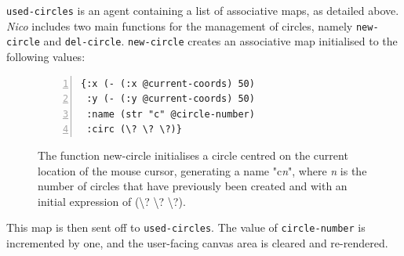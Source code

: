 \documentclass[12pt,twoside,notitlepage,xetex]{report}
\begin{document}
\verb¬used-circles¬ is an agent containing a list of associative maps, as
detailed above.  \emph{Nico} includes two main functions for the management of
circles, namely \verb¬new-circle¬ and \verb¬del-circle¬.  \verb¬new-circle¬
creates an associative map initialised to the following values:

\begin{center}
\begin{figure}[H]
\begin{center}
\begin{minipage}{2.5in}%
\begin{Verbatim}[fontsize=\small,numbers=left]
{:x (- (:x @current-coords) 50)
 :y (- (:y @current-coords) 50)
 :name (str "c" @circle-number)
 :circ (\? \? \?)}
\end{Verbatim}
\end{minipage}
\end{center}
\caption{The function {\ttfamily new-circle} initialises a circle centred on the current location of the mouse cursor, generating a name {\ttfamily "c}\emph{n}{\ttfamily "}, where \emph{n} is the number of circles that have previously been created and with an initial expression of {\ttfamily (\textbackslash? \textbackslash? \textbackslash?)}.}
\end{figure}
\end{center}

This map is then sent off to \verb¬used-circles¬.  The value of \verb¬circle-number¬ is incremented by one, and the user-facing canvas area is cleared and re-rendered.
\end{document}
